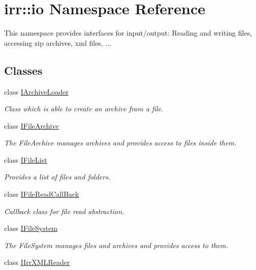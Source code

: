 \hypertarget{namespaceirr_1_1io}{}\section{irr\+:\+:io Namespace Reference}
\label{namespaceirr_1_1io}


This namespace provides interfaces for input/output\+: Reading and writing files, accessing zip archives, xml files, ...  


\subsection*{Classes}
\begin{DoxyCompactItemize}
\item 
class \hyperlink{classirr_1_1io_1_1IArchiveLoader}{I\+Archive\+Loader}
\begin{DoxyCompactList}\small\item\em Class which is able to create an archive from a file. \end{DoxyCompactList}\item 
class \hyperlink{classirr_1_1io_1_1IFileArchive}{I\+File\+Archive}
\begin{DoxyCompactList}\small\item\em The File\+Archive manages archives and provides access to files inside them. \end{DoxyCompactList}\item 
class \hyperlink{classirr_1_1io_1_1IFileList}{I\+File\+List}
\begin{DoxyCompactList}\small\item\em Provides a list of files and folders. \end{DoxyCompactList}\item 
class \hyperlink{classirr_1_1io_1_1IFileReadCallBack}{I\+File\+Read\+Call\+Back}
\begin{DoxyCompactList}\small\item\em Callback class for file read abstraction. \end{DoxyCompactList}\item 
class \hyperlink{classirr_1_1io_1_1IFileSystem}{I\+File\+System}
\begin{DoxyCompactList}\small\item\em The File\+System manages files and archives and provides access to them. \end{DoxyCompactList}\item 
class \hyperlink{classirr_1_1io_1_1IIrrXMLReader}{I\+Irr\+X\+M\+L\+Reader}

\end{DoxyCompactItemize}
